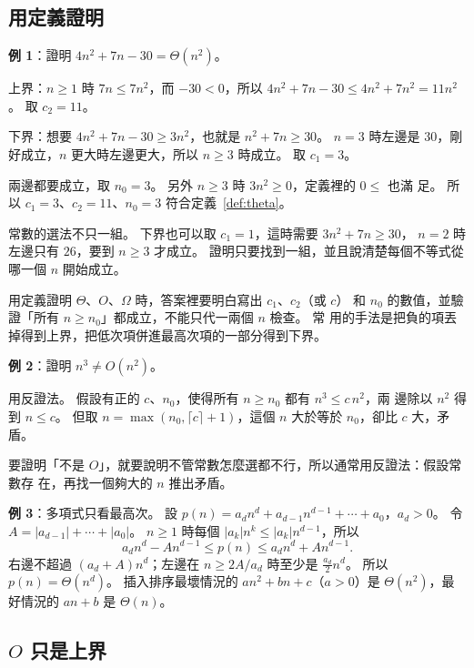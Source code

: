 \subsection{用定義證明}

\textbf{例 1}：證明 $4n^2 + 7n - 30 = \Theta(n^2)$。

上界：$n \ge 1$ 時 $7n \le 7n^2$，而 $-30 < 0$，所以
$4n^2 + 7n - 30 \le 4n^2 + 7n^2 = 11n^2$。 取 $c_2 = 11$。

下界：想要 $4n^2 + 7n - 30 \ge 3n^2$，也就是 $n^2 + 7n \ge 30$。 $n = 3$ 時左邊是
$30$，剛好成立，$n$ 更大時左邊更大，所以 $n \ge 3$ 時成立。 取 $c_1 = 3$。

兩邊都要成立，取 $n_0 = 3$。 另外 $n \ge 3$ 時 $3n^2 \ge 0$，定義裡的 $0 \le$ 也滿
足。 所以 $c_1 = 3$、$c_2 = 11$、$n_0 = 3$ 符合定義~\ref{def:theta}。

常數的選法不只一組。 下界也可以取 $c_1 = 1$，這時需要 $3n^2 + 7n \ge 30$，
$n = 2$ 時左邊只有 $26$，要到 $n \ge 3$ 才成立。 證明只要找到一組，並且說清楚每個不等式從哪一個 $n$ 開始成立。

\begin{examnote}
用定義證明 $\Theta$、$O$、$\Omega$ 時，答案裡要明白寫出 $c_1$、$c_2$（或 $c$）
和 $n_0$ 的數值，並驗證「所有 $n \ge n_0$」都成立，不能只代一兩個 $n$ 檢查。 常
用的手法是把負的項丟掉得到上界，把低次項併進最高次項的一部分得到下界。
\end{examnote}

\textbf{例 2}：證明 $n^3 \ne O(n^2)$。

用反證法。 假設有正的 $c$、$n_0$，使得所有 $n \ge n_0$ 都有 $n^3 \le c\,n^2$，兩
邊除以 $n^2$ 得到 $n \le c$。 但取 $n = \max(n_0, \lceil c \rceil + 1)$，這個 $n$
大於等於 $n_0$，卻比 $c$ 大，矛盾。

要證明「不是 $O$」，就要說明不管常數怎麼選都不行，所以通常用反證法：假設常數存
在，再找一個夠大的 $n$ 推出矛盾。

\textbf{例 3}：多項式只看最高次。 設
$p(n) = a_d n^d + a_{d-1} n^{d-1} + \cdots + a_0$，$a_d > 0$。 令
$A = |a_{d-1}| + \cdots + |a_0|$。 $n \ge 1$ 時每個 $|a_k| n^k \le |a_k| n^{d-1}$，所以
\[
a_d n^d - A n^{d-1} \le p(n) \le a_d n^d + A n^{d-1}.
\]
右邊不超過 $(a_d + A) n^d$；左邊在 $n \ge 2A / a_d$ 時至少是 $\frac{a_d}{2} n^d$。
所以 $p(n) = \Theta(n^d)$。 插入排序最壞情況的 $an^2 + bn + c$（$a > 0$）是
$\Theta(n^2)$，最好情況的 $an + b$ 是 $\Theta(n)$。

\subsection{$O$ 只是上界}

